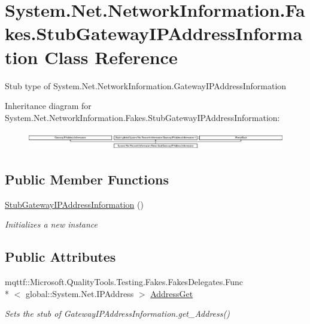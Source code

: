 \hypertarget{class_system_1_1_net_1_1_network_information_1_1_fakes_1_1_stub_gateway_i_p_address_information}{\section{System.\-Net.\-Network\-Information.\-Fakes.\-Stub\-Gateway\-I\-P\-Address\-Information Class Reference}
\label{class_system_1_1_net_1_1_network_information_1_1_fakes_1_1_stub_gateway_i_p_address_information}
}


Stub type of System.\-Net.\-Network\-Information.\-Gateway\-I\-P\-Address\-Information 


Inheritance diagram for System.\-Net.\-Network\-Information.\-Fakes.\-Stub\-Gateway\-I\-P\-Address\-Information\-:\begin{figure}[H]
\begin{center}
\leavevmode
\includegraphics[height=0.815138cm]{class_system_1_1_net_1_1_network_information_1_1_fakes_1_1_stub_gateway_i_p_address_information}
\end{center}
\end{figure}
\subsection*{Public Member Functions}
\begin{DoxyCompactItemize}
\item 
\hyperlink{class_system_1_1_net_1_1_network_information_1_1_fakes_1_1_stub_gateway_i_p_address_information_af9a6892b27f02f9fd8df14b6705723ba}{Stub\-Gateway\-I\-P\-Address\-Information} ()
\begin{DoxyCompactList}\small\item\em Initializes a new instance\end{DoxyCompactList}\end{DoxyCompactItemize}
\subsection*{Public Attributes}
\begin{DoxyCompactItemize}
\item 
mqttf\-::\-Microsoft.\-Quality\-Tools.\-Testing.\-Fakes.\-Fakes\-Delegates.\-Func\\*
$<$ global\-::\-System.\-Net.\-I\-P\-Address $>$ \hyperlink{class_system_1_1_net_1_1_network_information_1_1_fakes_1_1_stub_gateway_i_p_address_information_a63e2189c535d45753b4ad25a5bf51d07}{Address\-Get}
\begin{DoxyCompactList}\small\item\em Sets the stub of Gateway\-I\-P\-Address\-Information.\-get\-\_\-\-Address()\end{DoxyCompactList}\end{DoxyCompactItemize}
